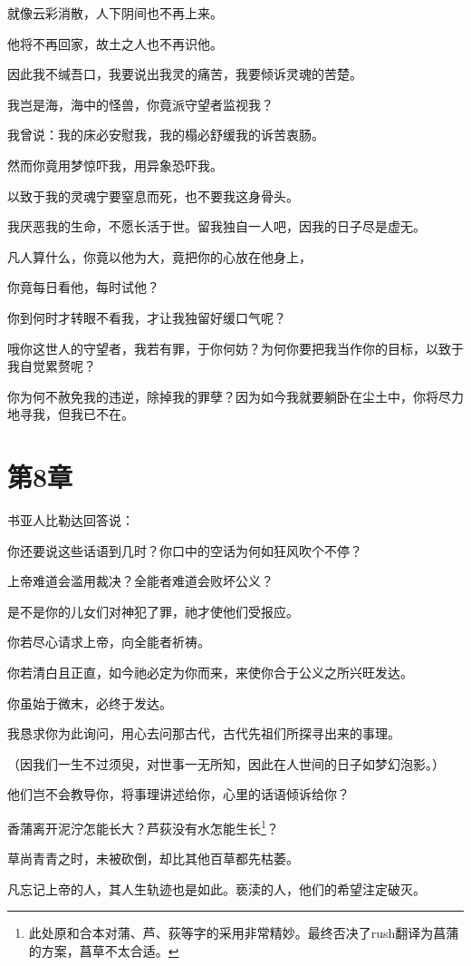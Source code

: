 \documentclass[12pt,oneside]{book}
\begin{document}
就像云彩消散，人下阴间也不再上来。

他将不再回家，故土之人也不再识他。

因此我不缄吾口，我要说出我灵的痛苦，我要倾诉灵魂的苦楚。

我岂是海，海中的怪兽，你竟派守望者监视我？

我曾说：我的床必安慰我，我的榻必舒缓我的诉苦衷肠。

然而你竟用梦惊吓我，用异象恐吓我。

以致于我的灵魂宁要窒息而死，也不要我这身骨头。

我厌恶我的生命，不愿长活于世。留我独自一人吧，因我的日子尽是虚无。

凡人算什么，你竟以他为大，竟把你的心放在他身上，

你竟每日看他，每时试他？

你到何时才转眼不看我，才让我独留好缓口气呢？

哦你这世人的守望者，我若有罪，于你何妨？为何你要把我当作你的目标，以致于我自觉累赘呢？

你为何不赦免我的违逆，除掉我的罪孽？因为如今我就要躺卧在尘土中，你将尽力地寻我，但我已不在。


\chapter{第8章}
书亚人比勒达回答说：

你还要说这些话语到几时？你口中的空话为何如狂风吹个不停？

上帝难道会滥用裁决？全能者难道会败坏公义？

是不是你的儿女们对神犯了罪，祂才使他们受报应。

你若尽心请求上帝，向全能者祈祷。

你若清白且正直，如今祂必定为你而来，来使你合于公义之所兴旺发达。

你虽始于微末，必终于发达。

我恳求你为此询问，用心去问那古代，古代先祖们所探寻出来的事理。

（因我们一生不过须臾，对世事一无所知，因此在人世间的日子如梦幻泡影。）

他们岂不会教导你，将事理讲述给你，心里的话语倾诉给你？

香蒲离开泥泞怎能长大？芦荻没有水怎能生长\footnote{此处原和合本对蒲、芦、荻等字的采用非常精妙。最终否决了rush翻译为菖蒲的方案，菖草不太合适。}？

草尚青青之时，未被砍倒，却比其他百草都先枯萎。

凡忘记上帝的人，其人生轨迹也是如此。亵渎的人，他们的希望注定破灭。
\end{document}
